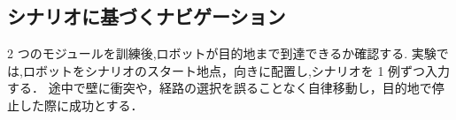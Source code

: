 \clearpage
\subsection{シナリオに基づくナビゲーション}
2 つのモジュールを訓練後,ロボットが目的地まで到達できるか確認する.
実験では,ロボットをシナリオのスタート地点，向きに配置し,シナリオを 1 例ずつ入力する．
途中で壁に衝突や，経路の選択を誤ることなく自律移動し，目的地で停止した際に成功とする．